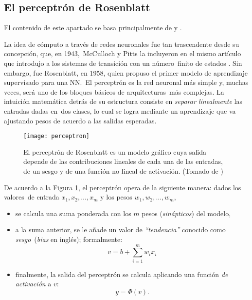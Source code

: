 \subsection{El perceptrón de Rosenblatt}

\noindent
El contenido de este apartado se basa principalmente de \cite{haykin2009} y \cite{rojas1996}.\par
La idea de cómputo a través de redes neuronales fue tan trascendente desde su concepción, que, en 1943,\
McCulloch y Pitts la incluyeron en el mismo artículo que introdujo a los sistemas de transición con un número\
finito de estados \cite{mcculloch:pitts}. Sin embargo, fue Rosenblatt, en 1958, quien propuso el primer modelo de aprendizaje supervisado para una NN.\
El perceptrón es la red neuronal más simple y, muchas veces, será uno de los bloques básicos de arquitecturas\
más complejas. La intuición matemática detrás de su estructura consiste en \emph{separar linealmente} las entradas dadas en\
dos clases, lo cual se logra mediante un aprendizaje que va ajustando pesos de acuerdo a las salidas esperadas.\par

\begin{figure}[h]
  \centering
  \texttt{[image: perceptron]}
  \caption{El perceptrón de Rosenblatt es un modelo gráfico cuya salida depende de las contribuciones
    lineales de cada una de las entradas, de un sesgo y de una función no lineal de activación.
    (Tomado de \cite{haykin2009})}
  \label{perceptron-fig}
\end{figure}


De acuerdo a la Figura \ref{perceptron-fig}, el perceptrón opera de la siguiente manera: dados los valores\
de entrada $x_1, x_2,\ldots, x_m$ y los pesos $w_1, w_2,\ldots, w_m$,
\begin{itemize}
\item se calcula una suma ponderada con los $m$ pesos (\emph{sinápticos}) del modelo,
\item a la suma anterior, se le añade un valor de \emph{``tendencia''} conocido como \emph{sesgo}\
  (\emph{bias} en inglés); formalmente:
  \begin{equation}
    v = b + \sum_{i=1}^{m} w_ix_i
  \end{equation}
\item finalmente, la salida del perceptrón se calcula aplicando una función \emph{de activación} a $v$:
    \begin{equation}
      y = \Phi(v).
    \end{equation}
\end{itemize}

